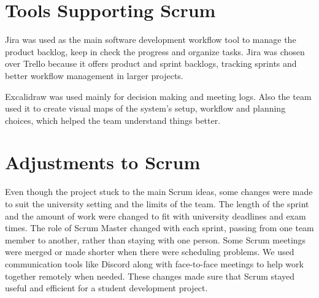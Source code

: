 \section{Tools Supporting Scrum}
Jira \cite{jira} was used as the main software development workflow tool to manage the product backlog, keep in check the progress and organize tasks. Jira was chosen over Trello \cite{trello} because it offers product and sprint backlogs, tracking sprints and better workflow management in larger projects.
\par
Excalidraw \cite{excalidraw} was used mainly for decision making and meeting logs. Also the team used it to create visual maps of the system's setup, workflow and planning choices, which helped the team understand things better. 

\section{Adjustments to Scrum}
Even though the project stuck to the main Scrum ideas, some changes were made to suit the university setting and the limits of the team. The length of the sprint and the amount of work were changed to fit with university deadlines and exam times. The role of Scrum Master changed with each sprint, passing from one team member to another, rather than staying with one person. Some Scrum meetings were merged or made shorter when there were scheduling problems. We used communication tools like Discord along with face-to-face meetings to help work together remotely when needed. These changes made sure that Scrum stayed useful and efficient for a student development project.
